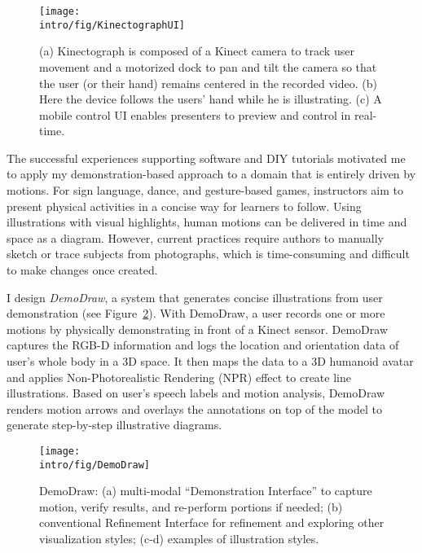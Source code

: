\begin{figure}[!t]
  \centering
  \texttt{[image: \\intro/fig/KinectographUI]}
  \caption{(a) Kinectograph is composed of a Kinect camera to track user movement and a motorized dock to pan and tilt the camera so that the user (or their hand) remains centered in the recorded video. (b) Here the device follows the users' hand while he is illustrating. (c) A mobile control UI enables presenters to preview and control in real-time. }
\label{fig:kinectograph_intro}
\end{figure}


The successful experiences supporting software and DIY tutorials motivated me to apply my demonstration-based approach to a domain that is entirely driven by motions. For sign language, dance, and gesture-based games, instructors aim to present physical activities in a concise way for learners to follow. Using illustrations with visual highlights, human motions can be delivered in time and space as a diagram. However, current practices require authors to manually sketch or trace subjects from photographs, which is time-consuming and difficult to make changes once created.

I design \emph{DemoDraw}, a system that generates concise illustrations from user demonstration (see Figure~\ref{fig:demodraw_intro}). With DemoDraw, a user records one or more motions by physically demonstrating in front of a Kinect sensor. DemoDraw captures the RGB-D information and logs the location and orientation data of user's whole body in a 3D space. It then maps the data to a 3D humanoid avatar and applies Non-Photorealistic Rendering (NPR) effect to create line illustrations. Based on user's speech labels and motion analysis, DemoDraw renders motion arrows and overlays the annotations on top of the model to generate step-by-step illustrative diagrams.

\begin{figure}[t]
  \centering
  \texttt{[image: \\intro/fig/DemoDraw]}
  \caption{DemoDraw: (a) multi-modal ``Demonstration Interface'' to capture motion, verify results, and re-perform portions if needed; (b) conventional Refinement Interface for refinement and exploring other visualization styles; (c-d) examples of illustration styles. }
  \label{fig:demodraw_intro}
\end{figure}

